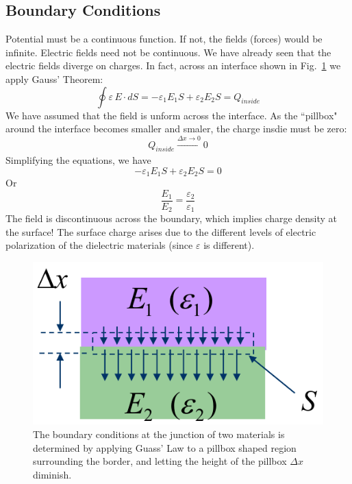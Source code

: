 \subsection{Boundary Conditions}
Potential must be a continuous function. If not, the fields (forces) would be infinite.  
 Electric fields need not be continuous. We have already seen that the electric fields diverge on charges. In fact, across an interface shown in Fig.~\ref{fig:mod2-2_ICtech_sld_16} we apply Gauss' Theorem: 
\begin{equation} 
	\oint {\varepsilon \,E \cdot dS = - {\varepsilon _1}{E_1}S + {\varepsilon _2}{E_2}S = {Q_{inside}}}
\end{equation}
We have assumed that the field is unform across the interface.  As the ``pillbox" around the interface becomes smaller and smaler, the charge insdie must be zero:
\begin{equation} 
	Q_{inside} \xrightarrow[]{\Delta x \rightarrow 0} 0 
\end{equation}
Simplifying the equations, we have 
\begin{equation}  
	- {\varepsilon _1}{E_1}S + {\varepsilon _2}{E_2}S = 0
\end{equation}
Or
\begin{equation} 
	\frac{{{E_1}}}{{{E_2}}} = \frac{{{\varepsilon _2}}}{{{\varepsilon _1}}} 
\end{equation}
The field is discontinuous across the boundary, which implies charge density at the surface!  The surface charge arises due to the different levels of electric polarization of the dielectric materials (since $\varepsilon$ is different).
\begin{figure}[tb]
\begin{center}
\includegraphics[width=.35\columnwidth]{mod2-2_ICtech_sld_16}
\end{center}
\caption{The boundary conditions at the junction of two materials is determined by applying Guass' Law to a pillbox shaped region surrounding the border, and letting the height of the pillbox $\Delta x$ diminish.}
\label{fig:mod2-2_ICtech_sld_16}
\end{figure}
